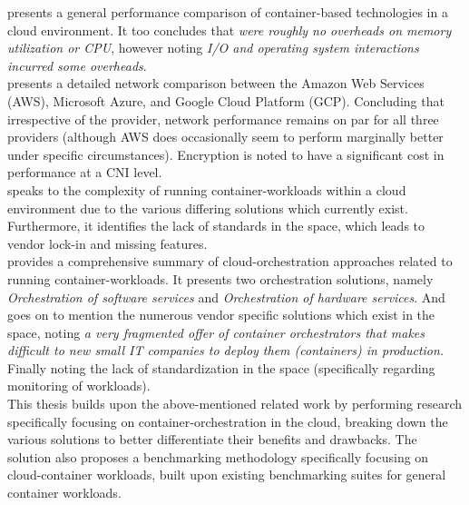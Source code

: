 \noindent \cite{KOZHIRBAYEV2017175} presents a general performance comparison of container-based technologies in a cloud environment. 
It too concludes that \emph{were roughly no overheads on memory utilization or CPU}, however noting \emph{I/O and operating system interactions incurred some overheads}.  \\

\noindent \cite{8500285} presents a detailed network comparison between the Amazon Web Services (AWS), Microsoft Azure, and Google Cloud Platform (GCP). 
Concluding that irrespective of the provider, network performance remains on par for all three providers 
(although AWS does occasionally seem to perform marginally better under specific circumstances). Encryption is noted to have a significant cost in performance at a CNI level. \\

\noindent \cite{quint2016overcome} speaks to the complexity of running container-workloads within a cloud environment due to the various differing solutions which currently exist.
Furthermore, it identifies the lack of standards in the space, which leads to vendor lock-in and missing features. \\

\noindent \cite{7185168} provides a comprehensive summary of cloud-orchestration approaches related to running container-workloads. It presents two orchestration solutions, namely 
\emph{Orchestration of software services} and \emph{Orchestration of hardware services}. 
And goes on to mention the numerous vendor specific solutions which exist in the space, noting 
\emph{a very fragmented offer of container orchestrators that makes difficult to new small IT companies to deploy them (containers) in production.}
Finally noting the lack of standardization in the space (specifically regarding monitoring of workloads). \\ 

\noindent This thesis builds upon the above-mentioned related work by performing research specifically focusing on container-orchestration 
in the cloud, breaking down the various solutions to better differentiate their benefits and drawbacks.
The solution also proposes a benchmarking methodology specifically focusing on cloud-container workloads, built upon existing benchmarking suites for general container workloads.
